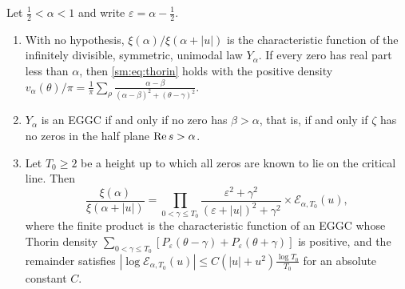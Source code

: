 \begin{theorem}\label{sm:thm:strip}
Let $\frac12<\alpha<1$ and write $\varepsilon=\alpha-\frac12$.
\begin{enumerate}
\item With no hypothesis, $\xi(\alpha)/\xi(\alpha+|u|)$ is the characteristic function of the infinitely divisible, symmetric, unimodal law $Y_\alpha$. If every zero has real part less than $\alpha$, then \eqref{sm:eq:thorin} holds with the positive density $v_\alpha(\theta)/\pi=\frac1\pi\sum_\rho\frac{\alpha-\beta}{(\alpha-\beta)^2+(\theta-\gamma)^2}$.
\item $Y_\alpha$ is an EGGC if and only if no zero has $\beta>\alpha$, that is, if and only if $\zeta$ has no zeros in the half plane $\operatorname{Re} s>\alpha$.
\item Let $T_0\ge2$ be a height up to which all zeros are known to lie on the critical line. Then
\[
\frac{\xi(\alpha)}{\xi(\alpha+|u|)}=\prod_{0<\gamma\le T_0}\frac{\varepsilon^2+\gamma^2}{(\varepsilon+|u|)^2+\gamma^2}\times\mathcal E_{\alpha,T_0}(u),
\]
where the finite product is the characteristic function of an EGGC whose Thorin density $\sum_{0<\gamma\le T_0}[P_\varepsilon(\theta-\gamma)+P_\varepsilon(\theta+\gamma)]$ is positive, and the remainder satisfies $|\log\mathcal E_{\alpha,T_0}(u)|\le C(|u|+u^2)\frac{\log T_0}{T_0}$ for an absolute constant $C$.
\end{enumerate}
\end{theorem}

